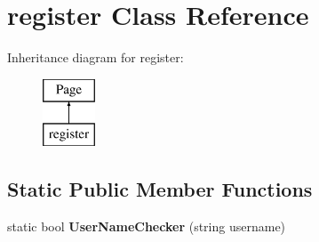 \hypertarget{classregister}{\section{register Class Reference}
\label{classregister}
}
Inheritance diagram for register\-:\begin{figure}[H]
\begin{center}
\leavevmode
\includegraphics[height=2.000000cm]{classregister}
\end{center}
\end{figure}
\subsection*{Static Public Member Functions}
\begin{DoxyCompactItemize}
\item 
\hypertarget{classregister_a4f840630c47bf698b613359daf077c49}{static bool {\bfseries User\-Name\-Checker} (string username)}\label{classregister_a4f840630c47bf698b613359daf077c49}

\end{DoxyCompactItemize}
